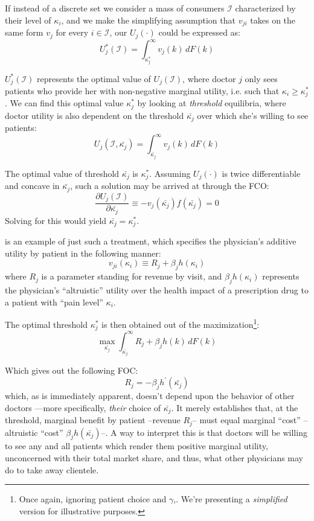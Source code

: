 \documentclass[../main.tex]{subfiles}
\begin{document}
If instead of a discrete set we consider a mass of consumers $\mathcal{I}$ characterized by their level of $\kappa_i$, and we make the simplifying assumption that $v_{ji}$ takes on the same form $v_{j}$ for every $i \in \mathcal{I}$, our $U_j(\cdot)$ could be expressed as:
\[
U_j^*(\mathcal{I}) =\int_{\kappa_j^*}^{\infty} v_{j}(k) \, dF(k)
\]

$U_j^*(\mathcal{I})$ represents the optimal value of $U_j(\mathcal{I})$, where doctor $j$ only sees patients who provide her with non-negative marginal utility, i.e. such that $\kappa_i \geq \kappa_j^*$. We can find this optimal value $\kappa_j^*$ by looking at \textit{threshold} equilibria, where doctor utility is also dependent on the threshold $\bar{\kappa_j}$ over which she’s willing to see patients:
\[
U_j(\mathcal{I}, \bar{\kappa_j}) =\int_{\bar{\kappa_j}}^{\infty} v_{j}(k) \, dF(k)
\]

The optimal value of threshold $\bar{\kappa_j}$ is $\kappa_j^*$. Assuming $U_j(\cdot) $ is twice differentiable and concave in $\bar{\kappa_j}$, such a solution may be arrived at through the FCO:
\[
\frac{\partial U_j(\mathcal{I})}{\partial \bar{\kappa_j}} \equiv - v_{j}(\bar{\kappa_j})f(\bar{\kappa_j}) = 0
\]
Solving for this would yield $\bar{\kappa_j} = \kappa_j^*$.

\cite{schnell2017physician} is an example of just such a treatment, which specifies the physician's additive utility by patient in the following manner:
\[
v_{ji}(\kappa_i) \equiv R_j + \beta_j h(\kappa_i)
\]
where $R_j$ is a parameter standing for revenue by visit, and $\beta_j h(\kappa_i)$ represents the physician's ``altruistic'' utility over the health impact of a prescription drug to a patient with ``pain level'' $\kappa_i$.

The optimal threshold $\kappa_j^*$ is then obtained out of the maximization\footnote{Once again, ignoring patient choice and $\gamma$,. We're presenting a \textit{simplified} version for illustrative purposes.}:
\[
\max_{\bar{\kappa_j}}\int_{\bar{\kappa_j}}^{\infty}  R_j + \beta_j h(k) \, dF(k)
\]

Which gives out the following FOC:
\[
R_j = - \beta_j h^{\prime}(\bar{\kappa_j})
\]
which, as is immediately apparent, doesn't depend upon the behavior of other doctors ---more specifically, \textit{their} choice of $\bar{\kappa_j}$. It merely establishes that, at the threshold, marginal benefit by patient --revenue $R_j$-- must equal marginal ``cost'' --altruistic ``cost'' $\beta_j h(\bar{\kappa_j})$--. A way to interpret this is that doctors will be willing to see any and all patients which render them positive marginal utility, unconcerned with their total market share, and thus, what other physicians may do to take away clientele.
\end{document}
